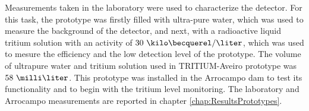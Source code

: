 Measurements taken in the laboratory were used to characterize the detector. For this task, the prototype was firstly filled with ultra-pure water, which was used to measure the background of the detector, and next, with a radioactive liquid tritium solution with an activity of $30~\kilo\becquerel/\liter$, which was used to mesure the efficiency and the low detection level of the prototype. The volume of ultrapure water and tritium solution used in TRITIUM-Aveiro prototype was $58~\milli\liter$. This prototype was installed in the Arrocampo dam to test its functionality and to begin with the tritium level monitoring. The laboratory and Arrocampo measurements are reported in chapter \ref{chap:ResultsPrototypes}.